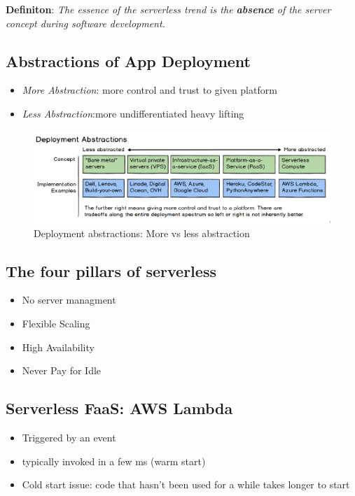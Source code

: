 \documentclass[a4paper]{article}
\begin{document}
\begin{multicols}{3}
\textbf{Definiton}: \textit{The essence of the serverless trend is the \textbf{absence} of the server concept during software development.}

\subsection*{Abstractions of App Deployment}
\begin{itemize}
    \item \textit{More Abstraction}: more control and trust to given platform
    \item \textit{Less Abstraction}:more undifferentiated heavy lifting
\end{itemize}

\begin{figure}[H]
    \includegraphics[width=\linewidth]{deploymentabstractions.png}
    \caption{Deployment abstractions: More vs less abstraction}
    \label{fig:deploymentabstractions}
\end{figure}

\subsection*{The four pillars of serverless}
\begin{itemize}
    \item No server managment
    \item Flexible Scaling
    \item High Availability
    \item Never Pay for Idle
\end{itemize}

\subsection*{Serverless FaaS: AWS Lambda}
\begin{itemize}
    \item Triggered by an event
    \item typically invoked in a few ms (warm start)
    \item Cold start issue: code that hasn't been used for a while takes longer to start
\end{itemize}


\end{multicols}
\end{document}
